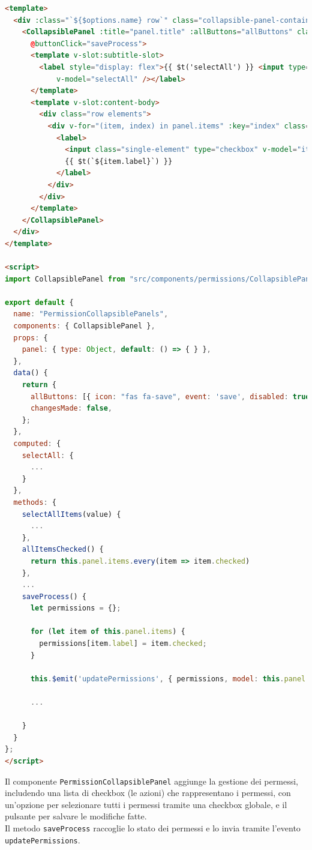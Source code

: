 \documentclass[a4paper, 12pt]{book}
\begin{document}
\begin{lstlisting}[language=HTML, caption=Implementazione di PermissionCollapsiblePanel]
<template>
  <div :class="`${$options.name} row`" class="collapsible-panel-container">
    <CollapsiblePanel :title="panel.title" :allButtons="allButtons" class="collapsible-panel" style="padding: 10px"
      @buttonClick="saveProcess">
      <template v-slot:subtitle-slot>
        <label style="display: flex">{{ $t('selectAll') }} <input type="checkbox" style="margin-left: 5px"
            v-model="selectAll" /></label>
      </template>
      <template v-slot:content-body>
        <div class="row elements">
          <div v-for="(item, index) in panel.items" :key="index" class="checkbox">
            <label>
              <input class="single-element" type="checkbox" v-model="item.checked" @change="updateChanges" />
              {{ $t(`${item.label}`) }}
            </label>
          </div>
        </div>
      </template>
    </CollapsiblePanel>
  </div>
</template>

<script>
import CollapsiblePanel from "src/components/permissions/CollapsiblePanel.vue";

export default {
  name: "PermissionCollapsiblePanels",
  components: { CollapsiblePanel },
  props: {
    panel: { type: Object, default: () => { } },
  },
  data() {
    return {
      allButtons: [{ icon: "fas fa-save", event: 'save', disabled: true }],
      changesMade: false,
    };
  },
  computed: {
    selectAll: {
      ...
    }
  },
  methods: {
    selectAllItems(value) {
      ...
    },
    allItemsChecked() {
      return this.panel.items.every(item => item.checked)
    },
    ...
    saveProcess() {
      let permissions = {};

      for (let item of this.panel.items) {
        permissions[item.label] = item.checked;
      }

      this.$emit('updatePermissions', { permissions, model: this.panel.model });

      ...

    }
  }
};
</script>
\end{lstlisting}

Il componente \texttt{PermissionCollapsiblePanel} aggiunge la gestione dei permessi, includendo
una lista di checkbox (le azioni) che rappresentano i permessi, con un'opzione per selezionare tutti i permessi
tramite una checkbox globale, e il pulsante per salvare le modifiche fatte.\\

Il metodo \texttt{saveProcess} raccoglie lo stato dei permessi e lo invia tramite l'evento \texttt{updatePermissions}.\\
\end{document}
